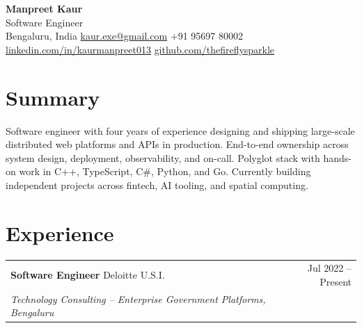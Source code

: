 \documentclass[10pt,letterpaper]{article}
\makeatletter
\newcommand{\jobheader}[4]{%
  \begin{tabularx}{\textwidth}{@{}Xr@{}}
    \textbf{#1} {\color{accent}\textbar{} #2} & {\color{accent}#3} \\
    \textit{#4} & \\
  \end{tabularx}\vspace{2pt}
}
\makeatother
\begin{document}
\begin{center}
  {\Huge\bfseries Manpreet Kaur} \\[4pt]
  {\color{accent}Software Engineer} \\[6pt]
  \small
  Bengaluru, India \quad\textbar{}\quad
  \href{mailto:kaur.exe@gmail.com}{kaur.exe@gmail.com} \quad\textbar{}\quad
  +91 95697 80002 \quad\textbar{}\quad
  \href{https://linkedin.com/in/kaurmanpreet013}{linkedin.com/in/kaurmanpreet013} \quad\textbar{}\quad
  \href{https://github.com/thefireflysparkle}{github.com/thefireflysparkle}
\end{center}

\vspace{-4pt}

\section*{Summary}

Software engineer with four years of experience designing and shipping
large-scale distributed web platforms and APIs in production. End-to-end
ownership across system design, deployment, observability, and on-call.
Polyglot stack with hands-on work in C++, TypeScript, C\#, Python, and Go.
Currently building independent projects across fintech, AI tooling, and
spatial computing.

\section*{Experience}

\jobheader{Software Engineer}{Deloitte U.S.I.}{Jul 2022 -- Present}{Technology Consulting -- Enterprise Government Platforms, Bengaluru}
\end{document}
